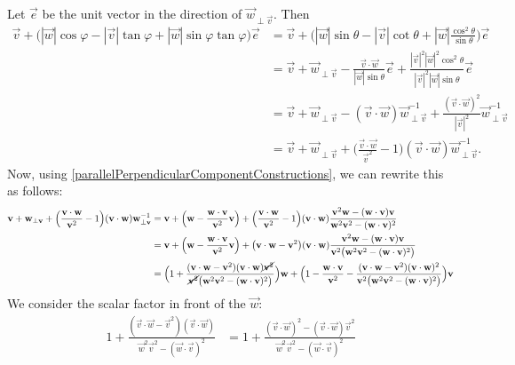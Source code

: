 \begin{note}
Let $\vec{e}$ be the unit vector in the direction of $\vec{w}_{\perp\vec{v}}$. Then
\begin{align*}
\vec{v} + \big(|\vec{w}|\cos\varphi - |\vec{v}|\tan\varphi + |\vec{w}|\sin\varphi\tan\varphi\big)\vec{e} &= \vec{v} + \big(|\vec{w}|\sin\theta - |\vec{v}|\cot\theta + |\vec{w}|\frac{\cos^2\theta}{\sin\theta}\big)\vec{e} \\
&= \vec{v} + \vec{w}_{\perp\vec{v}} - \frac{\vec{v}\cdot \vec{w}}{|\vec{w}|\sin\theta}\vec{e} + \frac{|\vec{v}|^2|\vec{w}|^2\cos^2\theta}{|\vec{v}|^2 |\vec{w}|\sin\theta}\vec{e} \\
&= \vec{v} + \vec{w}_{\perp\vec{v}} - (\vec{v}\cdot \vec{w})\vec{w}_{\perp\vec{v}}^{-1} + \frac{(\vec{v}\cdot \vec{w})^2}{|\vec{v}|^2 }\vec{w}_{\perp\vec{v}}^{-1} \\
&= \vec{v} + \vec{w}_{\perp\vec{v}}  + \Big(\frac{\vec{v}\cdot \vec{w}}{\vec{v}^2} - 1\Big)(\vec{v}\cdot \vec{w})\vec{w}_{\perp\vec{v}}^{-1}.
\end{align*}
Now, using \ref{parallelPerpendicularComponentConstructions}, we can rewrite this as follows:
\begin{align*}
\vec{v} + \vec{w}_{\perp\vec{v}}  + \Big(\frac{\vec{v}\cdot \vec{w}}{\vec{v}^2} - 1\Big)(\vec{v}\cdot \vec{w})\vec{w}_{\perp\vec{v}}^{-1} &= \vec{v} + \Big(\vec{w} - \frac{\vec{w}\cdot \vec{v}}{\vec{v}^2}\vec{v}\Big) + \Big(\frac{\vec{v}\cdot \vec{w}}{\vec{v}^2} - 1\Big)(\vec{v}\cdot \vec{w})\frac{\vec{v}^2 \vec{w} - (\vec{w}\cdot \vec{v})\vec{v}}{\vec{w}^2 \vec{v}^2 - (\vec{w}\cdot \vec{v})^2} \\
&= \vec{v} + \Big(\vec{w} - \frac{\vec{w}\cdot \vec{v}}{\vec{v}^2}\vec{v}\Big) + \big(\vec{v}\cdot \vec{w} - \vec{v}^2\big)(\vec{v}\cdot \vec{w})\frac{\vec{v}^2 \vec{w} - (\vec{w}\cdot \vec{v})\vec{v}}{\vec{v}^2\big(\vec{w}^2 \vec{v}^2 - (\vec{w}\cdot \vec{v})^2\big)} \\
&= \Big(1 + \frac{(\vec{v}\cdot \vec{w} - \vec{v}^2)(\vec{v}\cdot \vec{w})\cancel{\vec{v}^2}}{\cancel{\vec{v}^2}\big(\vec{w}^2 \vec{v}^2 - (\vec{w}\cdot \vec{v})^2\big)}\Big) \vec{w} + \Big(1 - \frac{\vec{w}\cdot \vec{v}}{\vec{v}^2} - \frac{(\vec{v}\cdot \vec{w} - \vec{v}^2)(\vec{v}\cdot \vec{w})^2}{\vec{v}^2\big(\vec{w}^2 \vec{v}^2 - (\vec{w}\cdot \vec{v})^2\big)}\Big)\vec{v}
\end{align*}
We consider the scalar factor in front of the $\vec{w}$:
\begin{align*}
1 + \frac{(\vec{v}\cdot \vec{w} - \vec{v}^2)(\vec{v}\cdot \vec{w})}{\vec{w}^2 \vec{v}^2 - (\vec{w}\cdot \vec{v})^2} &= 1 + \frac{(\vec{v}\cdot \vec{w})^2 - (\vec{v}\cdot \vec{w})\vec{v}^2}{\vec{w}^2 \vec{v}^2 - (\vec{w}\cdot \vec{v})^2} \\

\end{align*}
\end{note}
